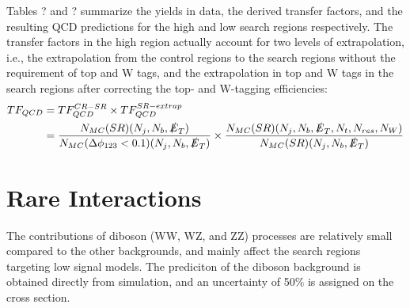 Tables ? and ? summarize the yields in data, the derived transfer factors, and the resulting QCD predictions for the high \dm{} and low \dm{} search regions respectively. The transfer factors in the high \dm{} region actually account for two levels of extrapolation, i.e., the extrapolation from the control regions to the search regions without the requirement of top and W tags, and the extrapolation in top and W tags in the search regions after correcting the top- and W-tagging efficiencies:
\begin{equation}\label{QCDTFExtrapolation}
\begin{split}
TF_{QCD}&=TF_{QCD}^{CR-SR}\times TF_{QCD}^{SR-extrap} \\
&=\frac{N_{MC}(SR)(N_{j},N_{b},\slashed{E}_{T})}{N_{MC}(\Delta\phi_{123}<0.1)(N_{j},N_{b},\slashed{E}_{T})}\times\frac{N_{MC}(SR)(N_{j},N_{b},\slashed{E}_{T},N_{t},N_{res},N_{W})}{N_{MC}(SR)(N_{j},N_{b},\slashed{E}_{T})}
\end{split}
\end{equation}

\section{Rare Interactions}
\label{subsec:rare}

The contributions of diboson (WW, WZ, and ZZ) processes are relatively small compared to the other backgrounds, and mainly affect the search regions targeting low \dm{} signal models. The prediciton of the diboson background is obtained directly from simulation, and an uncertainty of 50\% is assigned on the cross section.

